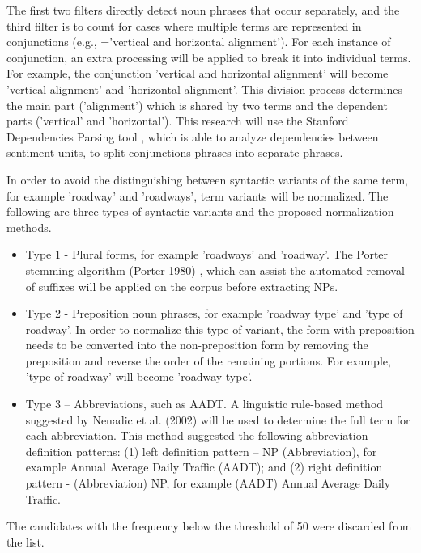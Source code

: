 \documentclass[Journal, InsideFigs, DoubleSpace]{ascelike} %
\begin{document}
% 
\par
The first two filters directly detect noun phrases that occur separately, and the third filter is to count for cases where multiple terms are represented in conjunctions (e.g., ='vertical and horizontal alignment'). For each instance of conjunction, an extra processing will be applied to break it into individual terms. For example, the conjunction 'vertical and horizontal alignment' will become 'vertical alignment' and 'horizontal alignment'. This division process determines the main part ('alignment') which is shared by two terms and the dependent parts ('vertical' and 'horizontal'). This research will use the Stanford Dependencies Parsing tool , which is able to analyze dependencies between sentiment units, to split conjunctions phrases into separate phrases.  
\par
In order to avoid the distinguishing between syntactic variants of the same term, for example 'roadway' and 'roadways', term variants will be normalized. The following are three types of syntactic variants and the proposed normalization methods. 
\begin{itemize}
	\item Type 1 - Plural forms, for example 'roadways' and 'roadway'. The Porter stemming algorithm (Porter 1980) \cite{porter80}, which can assist the automated removal of suffixes will be applied on the corpus before extracting NPs.
	\item Type 2 - Preposition noun phrases, for example 'roadway type' and 'type of roadway'. In order to normalize this type of variant, the form with preposition needs to be converted into the non-preposition form by removing the preposition and reverse the order of the remaining portions. For example, 'type of roadway' will become 'roadway type'.
	\item Type 3 – Abbreviations, such as AADT. A linguistic rule-based method suggested by Nenadic et al. (2002) \cite{nenadic02} will be used to determine the full term for each abbreviation. This method suggested the following abbreviation definition patterns: (1) left definition pattern – NP (Abbreviation), for example Annual Average Daily Traffic (AADT); and (2) right definition pattern - (Abbreviation) NP, for example (AADT) Annual Average Daily Traffic.
\end{itemize}
\par
The candidates with the frequency below the threshold of 50 were discarded from the list.
%
\end{document}
